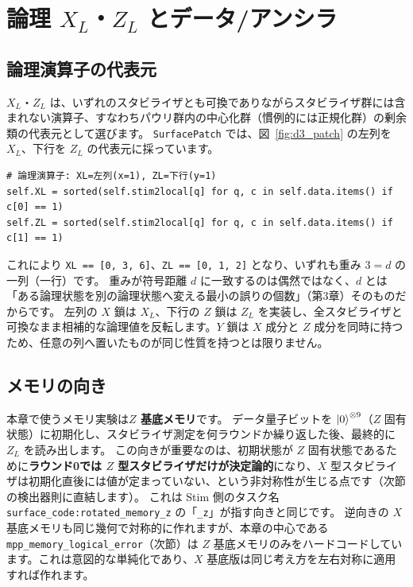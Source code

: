 \section{論理 \texorpdfstring{$X_L$・$Z_L$}{X\_L・Z\_L} とデータ/アンシラ}\label{sec:logical_ops}

\subsection{論理演算子の代表元}

$X_L$・$Z_L$ は、いずれのスタビライザとも可換でありながらスタビライザ群には含まれない演算子、すなわちパウリ群内の中心化群（慣例的には正規化群）の剰余類の代表元として選びます\cite{gottesman1997stabilizer}。
\texttt{SurfacePatch} では、図~\ref{fig:d3_patch} の左列を $X_L$、下行を $Z_L$ の代表元に採っています。

\begin{lstlisting}[caption={論理演算子の支持集合（\codepath{src/stages/01_mpp/src/ftqc/surface_patch.py} の \texttt{SurfacePatch.\_\_init\_\_}）},label=lst:xl_zl]
# 論理演算子: XL=左列(x=1), ZL=下行(y=1)
self.XL = sorted(self.stim2local[q] for q, c in self.data.items() if c[0] == 1)
self.ZL = sorted(self.stim2local[q] for q, c in self.data.items() if c[1] == 1)
\end{lstlisting}

これにより \texttt{XL == [0, 3, 6]}、\texttt{ZL == [0, 1, 2]} となり、いずれも重み $3=d$ の一列（一行）です。
重みが符号距離 $d$ に一致するのは偶然ではなく、$d$ とは「ある論理状態を別の論理状態へ変える最小の誤りの個数」（第3章）そのものだからです。
左列の $X$ 鎖は $X_L$、下行の $Z$ 鎖は $Z_L$ を実装し、全スタビライザと可換なまま相補的な論理値を反転します。$Y$ 鎖は $X$ 成分と $Z$ 成分を同時に持つため、任意の列へ置いたものが同じ性質を持つとは限りません。

\subsection{メモリの向き}

本章で使うメモリ実験は\textbf{$Z$ 基底メモリ}です。
データ量子ビットを $\ket{0}^{\otimes 9}$（$Z$ 固有状態）に初期化し、スタビライザ測定を何ラウンドか繰り返した後、最終的に $Z_L$ を読み出します。
この向きが重要なのは、初期状態が $Z$ 固有状態であるために\textbf{ラウンド0では $Z$ 型スタビライザだけが決定論的}になり、$X$ 型スタビライザは初期化直後には値が定まっていない、という非対称性が生じる点です（次節の検出器則に直結します）。
これは Stim 側のタスク名 \texttt{surface\_code:rotated\_memory\_z} の「\texttt{\_z}」が指す向きと同じです。
逆向きの $X$ 基底メモリも同じ幾何で対称的に作れますが、本章の中心である \texttt{mpp\_memory\_logical\_error}（次節）は $Z$ 基底メモリのみをハードコードしています。これは意図的な単純化であり、$X$ 基底版は同じ考え方を左右対称に適用すれば作れます。

